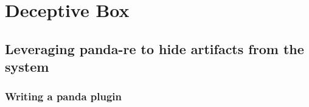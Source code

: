 \chapter{Deceptive Box}

\section{Leveraging panda-re to hide artifacts from the system}

\subsection{Writing a panda plugin}